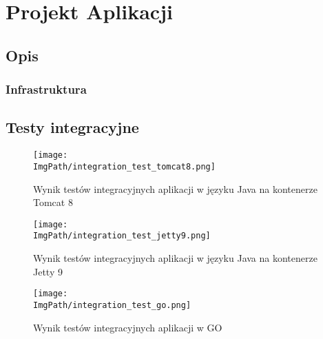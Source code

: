 \chapter{Projekt Aplikacji}
\section{Opis}
\subsection{Infrastruktura}
\section{Testy integracyjne}

\begin{figure}[!htb]
\centering
\hspace*{-3,5cm}
\texttt{[image: \\ImgPath/integration\_test\_tomcat8.png]}
\caption{Wynik testów integracyjnych aplikacji w języku Java na kontenerze Tomcat 8}
\end{figure}

\newpage
\begin{figure}[!ht]
\centering
\hspace*{-3cm}
\texttt{[image: \\ImgPath/integration\_test\_jetty9.png]}
\caption{Wynik testów integracyjnych aplikacji w języku Java na kontenerze Jetty 9}
\end{figure}

\newpage
\begin{figure}[!ht]
\centering
\hspace*{-3,5cm}
\texttt{[image: \\ImgPath/integration\_test\_go.png]}
\caption{Wynik testów integracyjnych aplikacji w GO}
\end{figure}